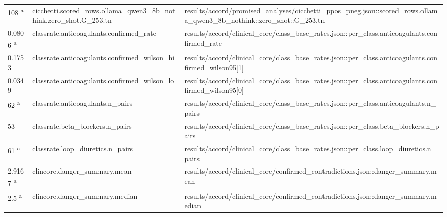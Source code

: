\begin{longtable}{@{}p{0.7in}p{1.9in}p{2.6in}@{}}
108 \textsuperscript{a} & cicchetti.\allowbreak{}scored\_rows.\allowbreak{}ollama\_qwen3\_8b\_nothink.\allowbreak{}zero\_shot.\allowbreak{}G\_253.\allowbreak{}tn & results/\allowbreak{}accord/\allowbreak{}promised\_analyses/\allowbreak{}cicchetti\_ppos\_pneg.\allowbreak{}json::scored\_rows.\allowbreak{}ollama\_qwen3\_8b\_nothink::zero\_shot::G\_253.\allowbreak{}tn\\
0.0806 \textsuperscript{a} & classrate.\allowbreak{}anticoagulants.\allowbreak{}confirmed\_rate & results/\allowbreak{}accord/\allowbreak{}clinical\_core/\allowbreak{}class\_base\_rates.\allowbreak{}json::per\_class.\allowbreak{}anticoagulants.\allowbreak{}confirmed\_rate\\
0.1753 & classrate.\allowbreak{}anticoagulants.\allowbreak{}confirmed\_wilson\_hi & results/\allowbreak{}accord/\allowbreak{}clinical\_core/\allowbreak{}class\_base\_rates.\allowbreak{}json::per\_class.\allowbreak{}anticoagulants.\allowbreak{}confirmed\_wilson95[1]\\
0.0349 & classrate.\allowbreak{}anticoagulants.\allowbreak{}confirmed\_wilson\_lo & results/\allowbreak{}accord/\allowbreak{}clinical\_core/\allowbreak{}class\_base\_rates.\allowbreak{}json::per\_class.\allowbreak{}anticoagulants.\allowbreak{}confirmed\_wilson95[0]\\
62 \textsuperscript{a} & classrate.\allowbreak{}anticoagulants.\allowbreak{}n\_pairs & results/\allowbreak{}accord/\allowbreak{}clinical\_core/\allowbreak{}class\_base\_rates.\allowbreak{}json::per\_class.\allowbreak{}anticoagulants.\allowbreak{}n\_pairs\\
53 & classrate.\allowbreak{}beta\_blockers.\allowbreak{}n\_pairs & results/\allowbreak{}accord/\allowbreak{}clinical\_core/\allowbreak{}class\_base\_rates.\allowbreak{}json::per\_class.\allowbreak{}beta\_blockers.\allowbreak{}n\_pairs\\
61 \textsuperscript{a} & classrate.\allowbreak{}loop\_diuretics.\allowbreak{}n\_pairs & results/\allowbreak{}accord/\allowbreak{}clinical\_core/\allowbreak{}class\_base\_rates.\allowbreak{}json::per\_class.\allowbreak{}loop\_diuretics.\allowbreak{}n\_pairs\\
2.9167 \textsuperscript{a} & clincore.\allowbreak{}danger\_summary.\allowbreak{}mean & results/\allowbreak{}accord/\allowbreak{}clinical\_core/\allowbreak{}confirmed\_contradictions.\allowbreak{}json::danger\_summary.\allowbreak{}mean\\
2.5 \textsuperscript{a} & clincore.\allowbreak{}danger\_summary.\allowbreak{}median & results/\allowbreak{}accord/\allowbreak{}clinical\_core/\allowbreak{}confirmed\_contradictions.\allowbreak{}json::danger\_summary.\allowbreak{}median\\

\end{longtable}
